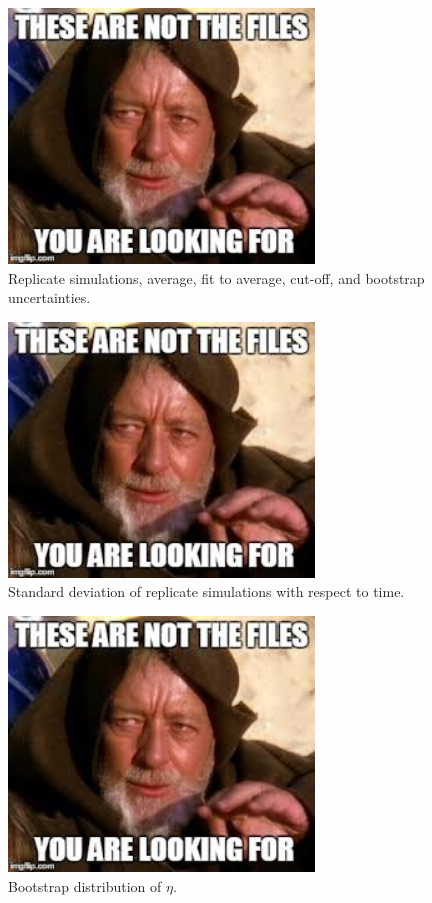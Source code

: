 \documentclass[preprint,review,12pt]{elsarticle}
\begin{document}
	\begin{figure}[htb!]
		\centering
		\includegraphics[width=3.2in]{empty_figure.jpg}
		\caption{Replicate simulations, average, fit to average, cut-off, and bootstrap uncertainties.}
		\label{fig:replicates}
	\end{figure} 

	\begin{figure}[htb!]
		\centering
		\includegraphics[width=3.2in]{empty_figure.jpg}
		\caption{Standard deviation of replicate simulations with respect to time.}
		\label{fig:standard_deviation}
	\end{figure} 

	\begin{figure}[htb!]
		\centering
		\includegraphics[width=3.2in]{empty_figure.jpg}
		\caption{Bootstrap distribution of $\eta$.}
		\label{fig:bootstraps}
	\end{figure} 

	
%	
	
	
\end{document}
